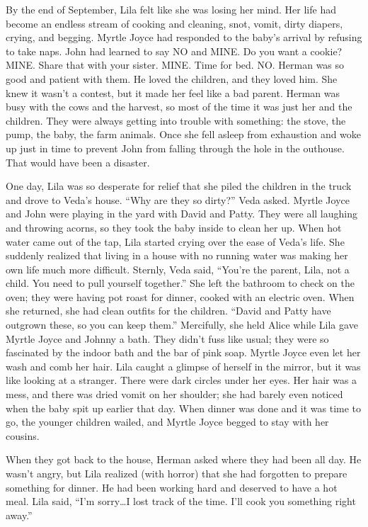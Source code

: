 \documentclass[
  letterpaper,
]{book}
\begin{document}
By the end of September, Lila felt like she was losing her mind. Her
life had become an endless stream of cooking and cleaning, snot, vomit,
dirty diapers, crying, and begging. Myrtle Joyce had responded to the
baby's arrival by refusing to take naps. John had learned to say NO and
MINE. Do you want a cookie? MINE. Share that with your sister. MINE.
Time for bed. NO. Herman was so good and patient with them. He loved the
children, and they loved him. She knew it wasn't a contest, but it made
her feel like a bad parent. Herman was busy with the cows and the
harvest, so most of the time it was just her and the children. They were
always getting into trouble with something: the stove, the pump, the
baby, the farm animals. Once she fell asleep from exhaustion and woke up
just in time to prevent John from falling through the hole in the
outhouse. That would have been a disaster.

One day, Lila was so desperate for relief that she piled the children in
the truck and drove to Veda's house. ``Why are they so dirty?'' Veda
asked. Myrtle Joyce and John were playing in the yard with David and
Patty. They were all laughing and throwing acorns, so they took the baby
inside to clean her up. When hot water came out of the tap, Lila started
crying over the ease of Veda's life. She suddenly realized that living
in a house with no running water was making her own life much more
difficult. Sternly, Veda said, ``You're the parent, Lila, not a child.
You need to pull yourself together.'' She left the bathroom to check on
the oven; they were having pot roast for dinner, cooked with an electric
oven. When she returned, she had clean outfits for the children. ``David
and Patty have outgrown these, so you can keep them.'' Mercifully, she
held Alice while Lila gave Myrtle Joyce and Johnny a bath. They didn't
fuss like usual; they were so fascinated by the indoor bath and the bar
of pink soap. Myrtle Joyce even let her wash and comb her hair. Lila
caught a glimpse of herself in the mirror, but it was like looking at a
stranger. There were dark circles under her eyes. Her hair was a mess,
and there was dried vomit on her shoulder; she had barely even noticed
when the baby spit up earlier that day. When dinner was done and it was
time to go, the younger children wailed, and Myrtle Joyce begged to stay
with her cousins.

When they got back to the house, Herman asked where they had been all
day. He wasn't angry, but Lila realized (with horror) that she had
forgotten to prepare something for dinner. He had been working hard and
deserved to have a hot meal. Lila said, ``I'm sorry\ldots I lost track
of the time. I'll cook you something right away.''
\end{document}
